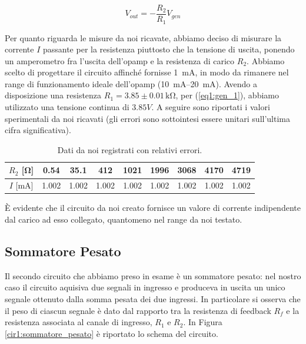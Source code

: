 $$V_{out}=-\frac{R_2}{R_1} V_{gen}$$

Per quanto riguarda le misure da noi ricavate, abbiamo deciso di misurare la corrente $I$ passante per la resistenza piuttosto che la tensione di uscita, ponendo un amperometro fra l'uscita dell'opamp e la resistenza di carico $R_2$.
Abbiamo scelto di progettare il circuito affinché fornisse \SI{1}{\milli\ampere}, in modo da rimanere nel range di funzionamento ideale dell'opamp (\SIrange{10}{20}{\milli\ampere}).
Avendo a disposizione una resistenza $R_1=3.85 \pm 0.01\,\si{\kilo\ohm}$, per (\ref{eq1:gen_1}), abbiamo utilizzato una tensione continua di $3.85 V$. A seguire sono riportati i valori sperimentali da noi ricavati (gli errori sono sottointesi essere unitari sull'ultima cifra significativa).

\begin{table}[H]
\center
\caption{Dati da noi registrati con relativi errori.}
{\renewcommand{\arraystretch}{1.4}%
\begin{tabular}{c|c|c|c|c|c|c|c|c}
$R_2$ [\si{\ohm}] & 0.54 & 35.1 & 412 & 1021 & 1996 & 3068 & 4170 & 4719 \\ 
\hline 
$I$ [\si{\milli\ampere}] & 1.002 & 1.002 & 1.002 & 1.002 & 1.002 & 1.002 & 1.002 & 1.002 \\ 
\end{tabular}}
\end{table}


È evidente che il circuito da noi creato fornisce un valore di corrente indipendente dal carico ad esso collegato, quantomeno nel range da noi testato.

\subsection{Sommatore Pesato}

Il secondo circuito che abbiamo preso in esame è un sommatore pesato: nel nostro caso il circuito aquisiva due segnali in ingresso e produceva in uscita un unico segnale ottenuto dalla somma pesata dei due ingressi. In particolare si osserva che il peso di ciascun segnale è dato dal rapporto tra la resistenza di feedback $R_f$ e la resistenza associata al canale di ingresso, $R_1$ e $R_2$. In Figura \ref{cir1:sommatore_pesato} è riportato lo schema del circuito.

